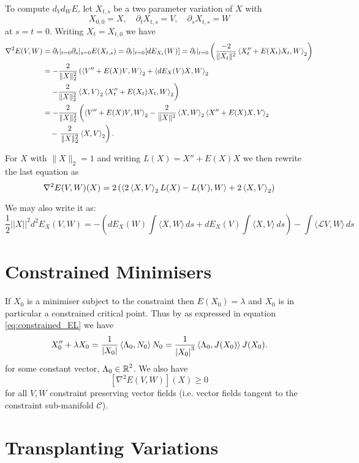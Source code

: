 \documentclass[12pt]{article}
\begin{document}
To compute \(d_V d_W E\), let \(X_{t,s}\) be a two parameter variation of \(X\) with
\[
X_{0,0} = X, \quad \partial_t X_{t,s} = V, \quad \partial_s X_{t,s} = W
\]
at \(s = t = 0\). Writing \(X_t = X_{t, 0}\) we have
\[
\begin{split}
\nabla^2 E(V, W) &= \partial_t|_{t=0} \partial_s|_{s=0} E(X_{t,s}) = \partial_t|_{t=0} [dE_{X_t} (W)] = \partial_t|_{t=0} \left(\frac{-2}{\|X_t\|^2} \left\langle{X_t'' + E(X_t) X_t},{W}\right\rangle_2\right) \\
&= -\frac{2}{\|X\|_2^2} \left(\left\langle{V'' + E(X) V},{W}\right\rangle_2 + \left\langle{dE_X (V)X},{W}\right\rangle_2 \right. \\
&\quad \left. - \frac{2}{\|X\|_2^2} \left\langle{X},{V}\right\rangle_2 \left\langle{X_t'' + E(X_t) X_t},{W}\right\rangle_2 \right) \\
&= -\frac{2}{\|X\|_2^2} \left(\left\langle{V'' + E(X) V},{W}\right\rangle_2 - \frac{2}{\|X\|^2} \left\langle{X},{W}\right\rangle_2 \left\langle{X'' + E(X) X},{V}\right\rangle_2 \right. \\
&\quad - \left. \frac{2}{\|X\|_2^2} \left\langle{X},{V}\right\rangle_2 \right).
\end{split}
\]

For \(X\) with \(\|X\|_2 = 1\) and writing \(L(X) = X'' + E(X) X\) we then rewrite the last equation as
\[
\nabla^2 E(V, W) (X) = 2\left(\left\langle{2\ensuremath{\left\langle{X},{V}\right\rangle}_2 L(X) - L(V)},{W}\right\rangle + 2\left\langle{X},{V}\right\rangle_2\right)
\]

We may also write it as:
\[
\frac12    ||X||^2    d^2 E_X(V,W)
= - \left( dE_X(W)\int \langle X,W \rangle \,ds + dE_X(V)\int \langle X,V \rangle \,ds \right)
-  \int \langle \mathcal{L} V, W \rangle  \,ds
\]


\section{Constrained Minimisers}

If \(X_0\) is a minimiser subject to the constraint then \(E(X_0) = \lambda\) and \(X_0\) is in particular a constrained critical point. Thus by  as expressed in equation \eqref{eq:constrained_EL} we have
\[
X_0'' + \lambda X_0 = \frac{1}{\left|{X_0}\right|} \left\langle{\Lambda_0},{N_0}\right\rangle N_0 = \frac{1}{\left|{X_0}\right|^3} \left\langle{\Lambda_0},{J(X_0)}\right\rangle J(X_0).
\]
for some constant vector, \(\Lambda_0 \in \operatorname{\mathbb{R}}^2\). We also have
\begin{equation}
\label{eq:hessian_minimiser_positive}
[\nabla^2 E(V, W)] (X) \geq 0
\end{equation}
for all \(V, W\) constraint preserving vector fields (i.e. vector fields tangent to the constraint sub-manifold \(\mathcal{C}\)).

\section{Transplanting Variations}
\end{document}

